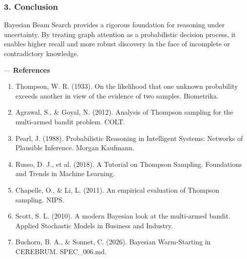 \documentclass[10pt,journal,compsoc]{IEEEtran}
\begin{document}
\subsubsection{3. Conclusion}
Bayesian Beam Search provides a rigorous foundation for reasoning under uncertainty. By treating graph attention as a proba\-bilistic decision process, it enables higher recall and more robust discovery in the face of incomplete or contr\-adictory knowledge.

---
\textbf{References}
\begin{enumerate}
\item Thompson, W. R. (1933). On the likelihood that one unknown probability exceeds another in view of the evidence of two samples. Biometrika.
\item Agrawal, S., \& Goyal, N. (2012). Analysis of Thompson sampling for the multi-armed bandit problem. COLT.
\item Pearl, J. (1988). Probab\-ilistic Reasoning in Intelligent Systems: Networks of Plausible Inference. Morgan Kaufmann.
\item Russo, D. J., et al. (2018). A Tutorial on Thompson Sampling. Foundations and Trends in Machine Learning.
\item Chapelle, O., \& Li, L. (2011). An empirical evaluation of Thompson sampling. NIPS.
\item Scott, S. L. (2010). A modern Bayesian look at the multi-armed bandit. Applied Stochastic Models in Business and Industry.
\item Buchorn, B. A., \& Sonnet, C. (2026). Bayesian Warm-Starting in CEREBRUM. SPEC\_006.md.

\end{enumerate}



\end{document}
